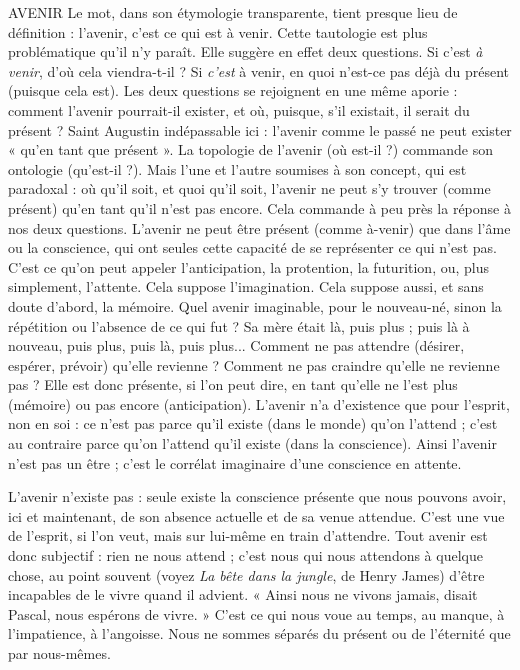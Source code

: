 AVENIR Le mot, dans son étymologie transparente, tient presque lieu de
définition : l'avenir, c’est ce qui est à venir. Cette tautologie est
plus problématique qu’il n’y paraît. Elle suggère en effet deux questions. Si
c’est {\it à venir}, d'où cela viendra-t-il ? Si {\it c'est} à venir, en quoi n’est-ce pas déjà
du présent (puisque cela est). Les deux questions se rejoignent en une même
aporie : comment l’avenir pourrait-il exister, et où, puisque, s’il existait, il
serait du présent ? Saint Augustin indépassable ici : l'avenir comme le passé
ne peut exister « qu’en tant que présent ». La topologie de l’avenir (où est-il ?)
commande son ontologie (qu’est-il ?). Mais l’une et l’autre soumises à
son concept, qui est paradoxal : où qu’il soit, et quoi qu’il soit, l’avenir ne
peut s’y trouver (comme présent) qu’en tant qu’il n’est pas encore. Cela
commande à peu près la réponse à nos deux questions. L'avenir ne peut être
présent (comme à-venir) que dans l’âme ou la conscience, qui ont seules
cette capacité de se représenter ce qui n’est pas. C’est ce qu’on peut appeler
l’anticipation, la protention, la futurition, ou, plus simplement, l’attente.
Cela suppose l'imagination. Cela suppose aussi, et sans doute d’abord, la
mémoire. Quel avenir imaginable, pour le nouveau-né, sinon la répétition
ou l’absence de ce qui fut ? Sa mère était là, puis plus ; puis là à nouveau,
puis plus, puis là, puis plus... Comment ne pas attendre (désirer, espérer,
prévoir) qu’elle revienne ? Comment ne pas craindre qu’elle ne revienne
pas ? Elle est donc présente, si l’on peut dire, en tant qu’elle ne l’est plus
(mémoire) ou pas encore (anticipation). L’avenir n’a d’existence que pour
l'esprit, non en soi : ce n’est pas parce qu’il existe (dans le monde) qu’on
l'attend ; c’est au contraire parce qu’on l’attend qu’il existe (dans la conscience).
Ainsi l’avenir n’est pas un être ; c’est le corrélat imaginaire d’une
conscience en attente.

L'avenir n'existe pas : seule existe la conscience présente que nous pouvons
avoir, ici et maintenant, de son absence actuelle et de sa venue attendue. C’est
une vue de l’esprit, si l’on veut, mais sur lui-même en train d’attendre. Tout
avenir est donc subjectif : rien ne nous attend ; c’est nous qui nous attendons à
quelque chose, au point souvent (voyez {\it La bête dans la jungle}, de Henry James)
d’être incapables de le vivre quand il advient. « Ainsi nous ne vivons jamais,
disait Pascal, nous espérons de vivre. » C’est ce qui nous voue au temps, au
manque, à l’impatience, à l’angoisse. Nous ne sommes séparés du présent ou de
l'éternité que par nous-mêmes.

